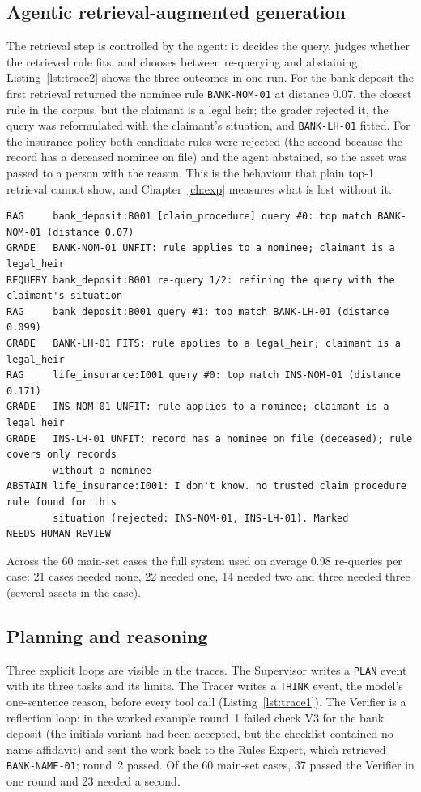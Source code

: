 \subsection{Agentic retrieval-augmented generation}
The retrieval step is controlled by the agent: it decides the query, judges whether the retrieved rule fits, and chooses between re-querying and abstaining. Listing~\ref{lst:trace2} shows the three outcomes in one run. For the bank deposit the first retrieval returned the nominee rule \texttt{BANK-NOM-01} at distance 0.07, the closest rule in the corpus, but the claimant is a legal heir; the grader rejected it, the query was reformulated with the claimant's situation, and \texttt{BANK-LH-01} fitted. For the insurance policy both candidate rules were rejected (the second because the record has a deceased nominee on file) and the agent abstained, so the asset was passed to a person with the reason. This is the behaviour that plain top-1 retrieval cannot show, and Chapter~\ref{ch:exp} measures what is lost without it.

\begin{lstlisting}[caption={Retrieval grading, re-query and abstention in the worked example (from the trace).},label={lst:trace2},numbers=none,basicstyle=\ttfamily\scriptsize\setstretch{1.0}]
RAG     bank_deposit:B001 [claim_procedure] query #0: top match BANK-NOM-01 (distance 0.07)
GRADE   BANK-NOM-01 UNFIT: rule applies to a nominee; claimant is a legal_heir
REQUERY bank_deposit:B001 re-query 1/2: refining the query with the claimant's situation
RAG     bank_deposit:B001 query #1: top match BANK-LH-01 (distance 0.099)
GRADE   BANK-LH-01 FITS: rule applies to a legal_heir; claimant is a legal_heir
RAG     life_insurance:I001 query #0: top match INS-NOM-01 (distance 0.171)
GRADE   INS-NOM-01 UNFIT: rule applies to a nominee; claimant is a legal_heir
GRADE   INS-LH-01 UNFIT: record has a nominee on file (deceased); rule covers only records
        without a nominee
ABSTAIN life_insurance:I001: I don't know. no trusted claim procedure rule found for this
        situation (rejected: INS-NOM-01, INS-LH-01). Marked NEEDS_HUMAN_REVIEW
\end{lstlisting}

Across the 60 main-set cases the full system used on average 0.98 re-queries per case: 21 cases needed none, 22 needed one, 14 needed two and three needed three (several assets in the case).

\subsection{Planning and reasoning}
Three explicit loops are visible in the traces. The Supervisor writes a \texttt{PLAN} event with its three tasks and its limits. The Tracer writes a \texttt{THINK} event, the model's one-sentence reason, before every tool call (Listing~\ref{lst:trace1}). The Verifier is a reflection loop: in the worked example round~1 failed check V3 for the bank deposit (the initials variant had been accepted, but the checklist contained no name affidavit) and sent the work back to the Rules Expert, which retrieved \texttt{BANK-NAME-01}; round~2 passed. Of the 60 main-set cases, 37 passed the Verifier in one round and 23 needed a second.

